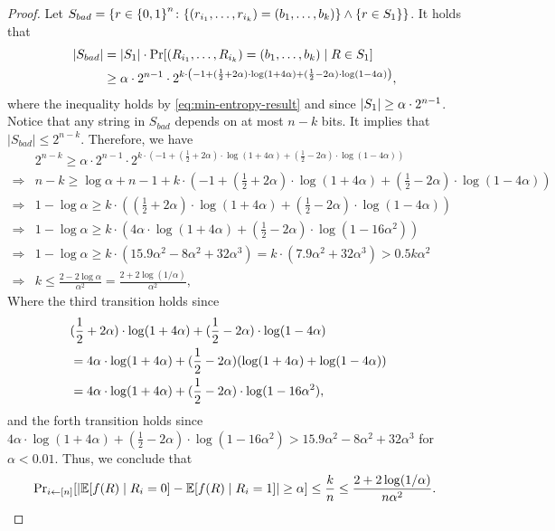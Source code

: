 {\begin{proof}
	Let $S_{bad}=\{r \in \zo^n  \colon \set{(r_{i_1},\ldots,r_{i_k}) = (b_1,\ldots,b_k)} \land \set{r\in S_1}\}$.
	It holds that
	\begin{align*}
		|S_{bad}|
		&= \size{S_1} \cdot \Pr\left[(R_{i_1},\ldots,R_{i_k}) = (b_1,\ldots,b_k) \mid R\in S_1\right]\\
		&\geq \alpha\cdot 2^{n-1}\cdot2^{k\cdot \left(-1+(\frac{1}{2}+2\alpha)\cdot\log(1+4\alpha)+(\frac{1}{2}-2\alpha)\cdot\log(1-4\alpha)\right)},
	\end{align*} 
	where the inequality holds by \cref{eq:min-entropy-result} and since $\size{S_1} \geq \alpha\cdot 2^{n-1}$.
	Notice that any string in $S_{bad}$ depends on at most $n-k$ bits. It implies that $|S_{bad}|\leq 2^{n-k}$. Therefore, we have
	$$
	\begin{array}{rl}
		&2^{n-k}\geq \alpha\cdot 2^{n-1}\cdot2^{k\cdot \left(-1+(\frac{1}{2}+2\alpha)\cdot\log(1+4\alpha)+(\frac{1}{2}-2\alpha)\cdot\log(1-4\alpha)\right)} \\
		\Rightarrow& n-k \geq \log \alpha+n-1+k\cdot \left(-1+(\frac{1}{2}+2\alpha)\cdot\log(1+4\alpha)+(\frac{1}{2}-2\alpha)\cdot\log(1-4\alpha)\right)\\
		\Rightarrow& 1-\log \alpha \geq k\cdot((\frac{1}{2}+2\alpha)\cdot\log(1+4\alpha)+(\frac{1}{2}-2\alpha)\cdot\log(1-4\alpha))\\
		\Rightarrow& 1-\log \alpha \geq k\cdot(4\alpha\cdot\log(1+4\alpha)+(\frac{1}{2}-2\alpha)\cdot\log(1-16\alpha^2))\\
        \Rightarrow& 1-\log\alpha \geq k\cdot(15.9\alpha^2-8\alpha^2+32\alpha^3)=k\cdot(7.9\alpha^2+32\alpha^3)>0.5k\alpha^2\\
		\Rightarrow& k\leq \frac{2-2\log \alpha}{\alpha^2} = \frac{2+2\log (1/\alpha)}{\alpha^2},
	\end{array}
	$$
	Where the third transition holds since 
	\begin{align*}
		\lefteqn{(\frac{1}{2}+2\alpha)\cdot\log(1+4\alpha)+(\frac{1}{2}-2\alpha)\cdot\log(1-4\alpha)}\\
		&= 4\alpha\cdot\log(1+4\alpha) + (\frac{1}{2}-2\alpha)\paren{\log(1+4\alpha)+\log(1-4\alpha)}\\
		&= 4\alpha\cdot\log(1+4\alpha)+(\frac{1}{2}-2\alpha)\cdot\log(1-16\alpha^2),
	\end{align*}
	and the forth transition holds since $4\alpha\cdot\log(1+4\alpha)+(\frac{1}{2}-2\alpha)\cdot\log(1-16\alpha^2) > 15.9\alpha^2-8\alpha^2+32\alpha^3$ for $\alpha < 0.01$.
	Thus, we conclude that 
	$$
	\Pr_{i\la[n]}\left[\size{\mathbb{E}[f(R) \mid R_i=0]-\mathbb{E}[f(R) \mid R_i = 1]}\geq \alpha\right]\leq \frac{k}{n}\leq \frac{2+2\log (1/\alpha)}{n\alpha^2}.
	$$
\end{proof}
}


